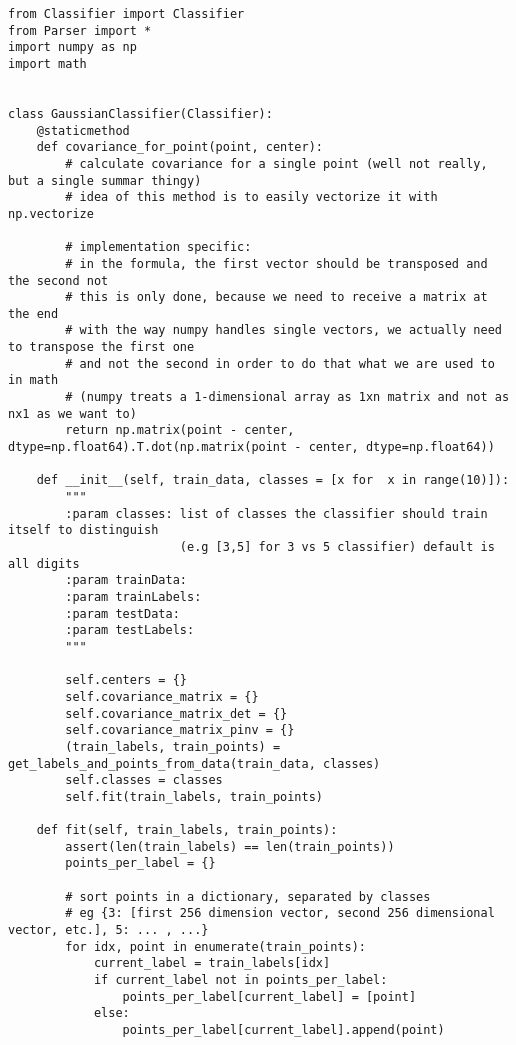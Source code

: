 \begin{lstlisting}[style]
from Classifier import Classifier
from Parser import *
import numpy as np
import math


class GaussianClassifier(Classifier):
    @staticmethod
    def covariance_for_point(point, center):
        # calculate covariance for a single point (well not really, but a single summar thingy)
        # idea of this method is to easily vectorize it with np.vectorize

        # implementation specific:
        # in the formula, the first vector should be transposed and the second not
        # this is only done, because we need to receive a matrix at the end
        # with the way numpy handles single vectors, we actually need to transpose the first one
        # and not the second in order to do that what we are used to in math
        # (numpy treats a 1-dimensional array as 1xn matrix and not as nx1 as we want to)
        return np.matrix(point - center, dtype=np.float64).T.dot(np.matrix(point - center, dtype=np.float64))

    def __init__(self, train_data, classes = [x for  x in range(10)]):
        """
        :param classes: list of classes the classifier should train itself to distinguish
                        (e.g [3,5] for 3 vs 5 classifier) default is all digits
        :param trainData:
        :param trainLabels:
        :param testData:
        :param testLabels:
        """

        self.centers = {}
        self.covariance_matrix = {}
        self.covariance_matrix_det = {}
        self.covariance_matrix_pinv = {}
        (train_labels, train_points) = get_labels_and_points_from_data(train_data, classes)
        self.classes = classes
        self.fit(train_labels, train_points)

    def fit(self, train_labels, train_points):
        assert(len(train_labels) == len(train_points))
        points_per_label = {}

        # sort points in a dictionary, separated by classes
        # eg {3: [first 256 dimension vector, second 256 dimensional vector, etc.], 5: ... , ...}
        for idx, point in enumerate(train_points):
            current_label = train_labels[idx]
            if current_label not in points_per_label:
                points_per_label[current_label] = [point]
            else:
                points_per_label[current_label].append(point)


\end{lstlisting}
